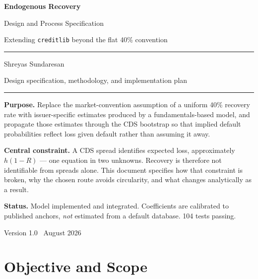 \documentclass[11pt,a4paper]{article}
\begin{document}
\begin{titlepage}
\centering
\vspace*{2.2cm}
{\Huge\bfseries\color{accent} Endogenous Recovery\par}
\vspace{0.7em}
{\LARGE Design and Process Specification\par}
\vspace{0.5em}
{\large Extending \texttt{creditlib} beyond the flat 40\% convention\par}
\vspace{2.2cm}
\rule{0.62\textwidth}{0.6pt}\par
\vspace{1.1em}
{\large Shreyas Sundaresan\par}
\vspace{0.4em}
{\normalsize Design specification, methodology, and implementation plan\par}
\vspace{1.1em}
\rule{0.62\textwidth}{0.6pt}\par
\vspace{2.2cm}

\begin{minipage}{0.86\textwidth}\small
\textbf{Purpose.} Replace the market-convention assumption of a uniform 40\%
recovery rate with issuer-specific estimates produced by a fundamentals-based model,
and propagate those estimates through the CDS bootstrap so that implied default
probabilities reflect loss given default rather than assuming it away.

\medskip
\textbf{Central constraint.} A CDS spread identifies expected loss, approximately
$h(1-R)$ --- one equation in two unknowns. Recovery is therefore not identifiable from
spreads alone. This document specifies how that constraint is broken, why the chosen
route avoids circularity, and what changes analytically as a result.

\medskip
\textbf{Status.} Model implemented and integrated. Coefficients are calibrated to
published anchors, \emph{not} estimated from a default database. 104 tests passing.
\end{minipage}

\vfill
{\small Version 1.0 \textbar\ August 2026}
\end{titlepage}

\tableofcontents
\newpage

\section{Objective and Scope}
\end{document}
